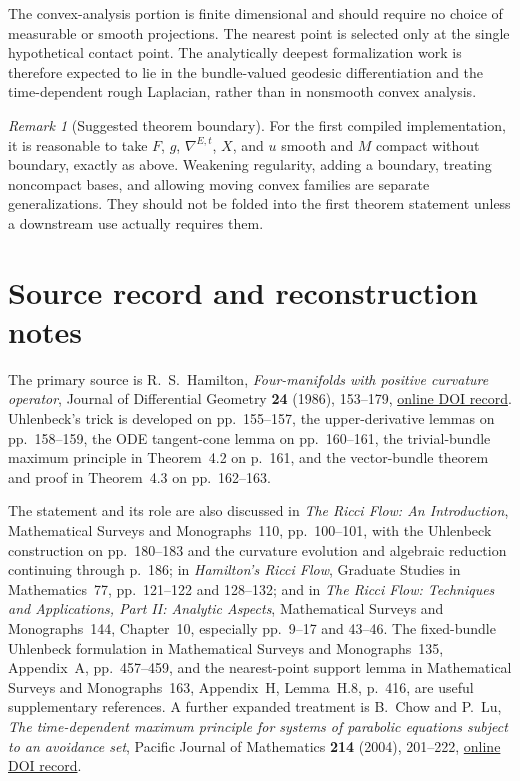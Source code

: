 \documentclass[10pt]{coll-l}
\theoremstyle{definition}
\theoremstyle{remark}
\newtheorem{remark}[theorem]{Remark}
\numberwithin{section}{chapter}
\numberwithin{equation}{chapter}
\begin{document}
The convex-analysis portion is finite dimensional and should require no
choice of measurable or smooth projections.  The nearest point is selected
only at the single hypothetical contact point.  The analytically deepest
formalization work is therefore expected to lie in the bundle-valued
geodesic differentiation and the time-dependent rough Laplacian, rather
than in nonsmooth convex analysis.

\begin{remark}[Suggested theorem boundary]
\label{rem:wmp-formal-boundary}
For the first compiled implementation, it is reasonable to take
$F$, $g$, $\nabla^{E,t}$, $X$, and $u$ smooth and $M$ compact without boundary,
exactly as above.  Weakening regularity, adding a boundary, treating
noncompact bases, and allowing moving convex families are separate
generalizations.  They should not be folded into the first theorem statement
unless a downstream use actually requires them.
\end{remark}

\section{Source record and reconstruction notes}
\label{sec:wmp-sources}

The primary source is R.~S.~Hamilton,
\emph{Four-manifolds with positive curvature operator},
Journal of Differential Geometry \textbf{24} (1986), 153--179,
\href{https://doi.org/10.4310/jdg/1214440433}
     {online DOI record}.
Uhlenbeck's trick is developed on pp.~155--157, the upper-derivative lemmas
on pp.~158--159, the ODE tangent-cone lemma on pp.~160--161, the
trivial-bundle maximum principle in Theorem~4.2 on p.~161, and the
vector-bundle theorem and proof in Theorem~4.3 on pp.~162--163.

The statement and its role are also discussed in \emph{The Ricci Flow: An
Introduction}, Mathematical Surveys and Monographs~110, pp.~100--101, with
the Uhlenbeck construction on pp.~180--183 and the curvature evolution and
algebraic reduction continuing through p.~186; in \emph{Hamilton's Ricci
Flow}, Graduate Studies in Mathematics~77, pp.~121--122 and 128--132; and
in \emph{The Ricci Flow: Techniques and Applications, Part II: Analytic
Aspects}, Mathematical Surveys and Monographs~144, Chapter~10, especially
pp.~9--17 and 43--46.
The fixed-bundle Uhlenbeck formulation in Mathematical Surveys and
Monographs~135, Appendix~A, pp.~457--459, and the nearest-point support
lemma in Mathematical Surveys and Monographs~163, Appendix~H,
Lemma~H.8, p.~416, are useful supplementary references.  A further expanded
treatment is B.~Chow and P.~Lu, \emph{The time-dependent maximum principle
for systems of parabolic equations subject to an avoidance set}, Pacific Journal of
Mathematics \textbf{214} (2004), 201--222,
\href{https://doi.org/10.2140/pjm.2004.214.201}{online DOI record}.
\end{document}
